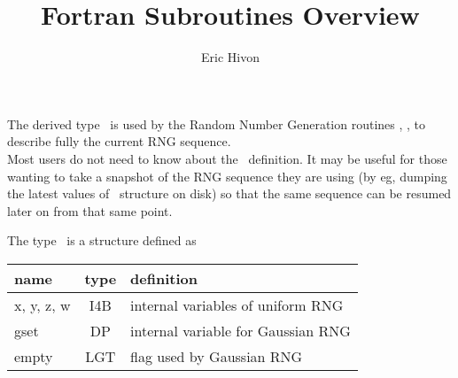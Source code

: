 
\sloppy


\title{\healpix Fortran Subroutines Overview}
 \section[planck\_rng derived type]{ }
\label{sub:planck_rng}
\author{Eric Hivon}

\begin{facility}
{The derived type \thedocid\ is used by the Random Number Generation routines 
,
, 
 to describe fully the current RNG
sequence.\\
Most users do not need to know about the \thedocid\ definition. It may be
useful for those wanting to take a snapshot of the RNG sequence they are using (by eg,
dumping the latest values of \thedocid\ structure on disk) so that the same sequence can be resumed
later on from that same point.}
{\modRngmod}
\end{facility}



The type \thedocid\ is a structure defined as

\begin{mytable}{%
\begin{tabularx}{\linewidth}{lcX}
name & type  & definition \\
\hline
x, y, z, w & I4B & internal variables of uniform RNG\\
gset & DP & internal variable for Gaussian RNG\\
empty & LGT & flag used by Gaussian RNG\\
\hline
\end{tabularx}
}%
\end{mytable}




